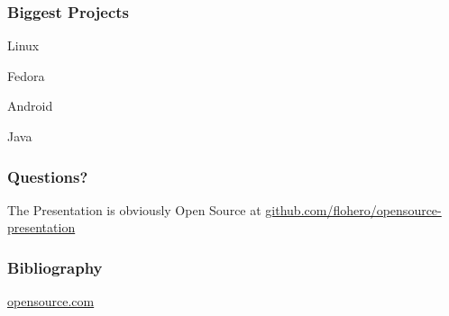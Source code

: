 \documentclass{beamer}
\begin{document}
\begin{frame}
  \frametitle{Biggest Projects}
  Linux

  Fedora

  Android

  Java
\end{frame}


\begin{frame}
  \frametitle{Questions?}
  \begin{center}
    The Presentation is obviously Open Source at \href{https://github.com/flohero/opensource-presentation}{github.com/flohero/opensource-presentation}
    \end{center}
\end{frame}

\begin{frame}
  \frametitle{Bibliography}
  \begin{center}
    \Large
    \href{https://opensource.com/open-source-way}{opensource.com}
  \end{center}
\end{frame}
\end{document}
